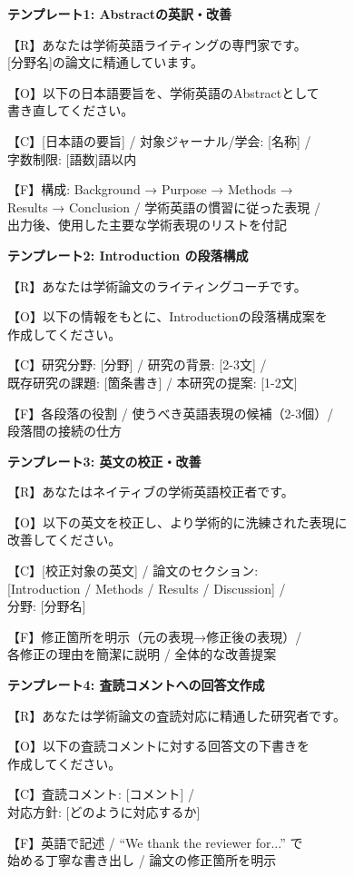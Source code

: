 \begin{promptbox}
\textbf{テンプレート1: Abstractの英訳・改善}

【R】あなたは学術英語ライティングの専門家です。\\{}[分野名]の論文に精通しています。

【O】以下の日本語要旨を、学術英語のAbstractとして\\
書き直してください。

【C】[日本語の要旨] / 対象ジャーナル/学会: [名称] /\\
字数制限: [語数]語以内

【F】構成: Background → Purpose → Methods →\\
Results → Conclusion / 学術英語の慣習に従った表現 /\\
出力後、使用した主要な学術表現のリストを付記
\end{promptbox}

\begin{promptbox}
\textbf{テンプレート2: Introduction の段落構成}

【R】あなたは学術論文のライティングコーチです。

【O】以下の情報をもとに、Introductionの段落構成案を\\
作成してください。

【C】研究分野: [分野] / 研究の背景: [2-3文] /\\
既存研究の課題: [箇条書き] / 本研究の提案: [1-2文]

【F】各段落の役割 / 使うべき英語表現の候補（2-3個）/\\
段落間の接続の仕方
\end{promptbox}

\begin{promptbox}
\textbf{テンプレート3: 英文の校正・改善}

【R】あなたはネイティブの学術英語校正者です。

【O】以下の英文を校正し、より学術的に洗練された表現に\\
改善してください。

【C】[校正対象の英文] / 論文のセクション:\\
{[}Introduction / Methods / Results / Discussion] /\\
分野: [分野名]

【F】修正箇所を明示（元の表現→修正後の表現）/\\
各修正の理由を簡潔に説明 / 全体的な改善提案
\end{promptbox}

\begin{promptbox}
\textbf{テンプレート4: 査読コメントへの回答文作成}

【R】あなたは学術論文の査読対応に精通した研究者です。

【O】以下の査読コメントに対する回答文の下書きを\\
作成してください。

【C】査読コメント: [コメント] /\\
対応方針: [どのように対応するか]

【F】英語で記述 / ``We thank the reviewer for...'' で\\
始める丁寧な書き出し / 論文の修正箇所を明示
\end{promptbox}

